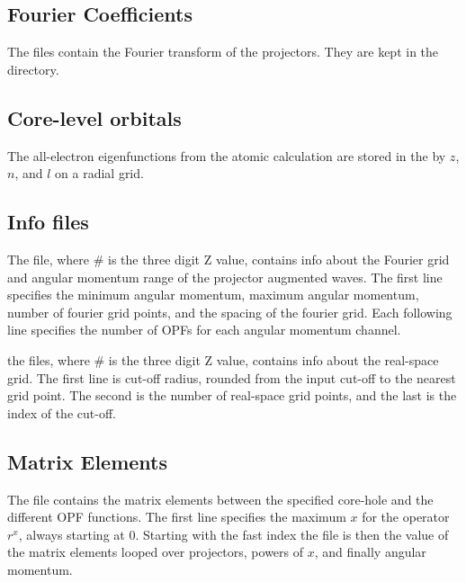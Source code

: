 \documentclass[11pt]{report}
\begin{document}
\subsection{Fourier Coefficients}
The  files contain the Fourier transform of the projectors. They are kept in the  directory.

\subsection{Core-level orbitals}
The all-electron eigenfunctions from the atomic calculation are stored in the  by $z$, $n$, and $l$ on a radial grid.


\subsection{Info files}
The  file, where \# is the three digit Z value, contains info about the Fourier grid and angular momentum range of the projector augmented waves. The first line specifies the minimum angular momentum, maximum angular momentum, number of fourier grid points, and the spacing of the fourier grid. Each following line specifies the number of OPFs for each angular momentum channel. 

the  files, where \# is the three digit Z value, contains info about the real-space grid. The first line is cut-off radius, rounded from the input cut-off to the nearest grid point. The second is the number of real-space grid points, and the last is the index of the cut-off.


\subsection{Matrix Elements}

The  file contains the matrix elements between the specified core-hole and the different OPF functions. The first line specifies the maximum $x$ for the operator $r^x$, always starting at 0. Starting with the fast index the file is then the value of the matrix elements looped over projectors, powers of $x$, and finally angular momentum.
\end{document}
